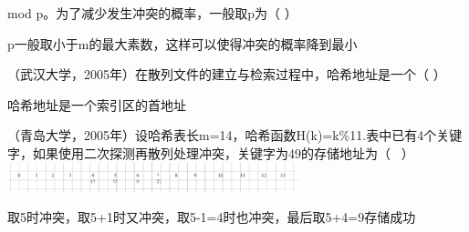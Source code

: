 mod p。为了减少发生冲突的概率，一般取p为（ ）
\par{}
\begin{solution}p一般取小于m的最大素数，这样可以使得冲突的概率降到最小
\end{solution}
\question （武汉大学，2005年）在散列文件的建立与检索过程中，哈希地址是一个（ ）
\par{}
\begin{solution}哈希地址是一个索引区的首地址
\end{solution}
\question （青岛大学，2005年）设哈希表长m=14，哈希函数H(k)=k\%11.表中已有4个关键字，如果使用二次探测再散列处理冲突，关键字为49的存储地址为（
~）
\includegraphics[width=3.33333in,height=0.33333in]{computerassets/3d96db8ff2bac40204c152331f211bb3.png}
\par{}
\begin{solution}取5时冲突，取5+1时又冲突，取5-1=4时也冲突，最后取5+4=9存储成功
\end{solution}
